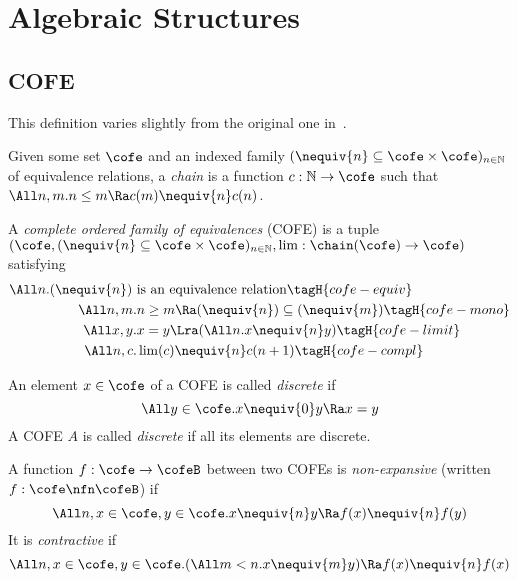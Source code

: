 \section{Algebraic Structures}

\subsection{COFE}

This definition varies slightly from the original one in~\cite{catlogic}.
\begin{defn}[Chain]
  Given some set $\cofe$ and an indexed family $({\nequiv{n}} \subseteq \cofe \times \cofe)_{n \in \mathbb{N}}$ of equivalence relations, a \emph{chain} is a function $c : \mathbb{N} \to \cofe$ such that $\All n, m. n \leq m \Ra c (m) \nequiv{n} c (n)$.
\end{defn}

\begin{defn}
  A \emph{complete ordered family of equivalences} (COFE) is a tuple $(\cofe, ({\nequiv{n}} \subseteq \cofe \times \cofe)_{n \in \mathbb{N}}, \lim : \chain(\cofe) \to \cofe)$ satisfying
  \begin{align*}
    \All n. (\nequiv{n}) ~& \text{is an equivalence relation} \tagH{cofe-equiv} \\
    \All n, m.& n \geq m \Ra (\nequiv{n}) \subseteq (\nequiv{m}) \tagH{cofe-mono} \\
    \All x, y.& x = y \Lra (\All n. x \nequiv{n} y) \tagH{cofe-limit} \\
    \All n, c.& \lim(c) \nequiv{n} c(n+1) \tagH{cofe-compl}
  \end{align*}
\end{defn}


\begin{defn}
  An element $x \in \cofe$ of a COFE is called \emph{discrete} if
  \[ \All y \in \cofe. x \nequiv{0} y \Ra x = y\]
  A COFE $A$ is called \emph{discrete} if all its elements are discrete.
\end{defn}

\begin{defn}
  A function $f : \cofe \to \cofeB$ between two COFEs is \emph{non-expansive} (written $f : \cofe \nfn \cofeB$) if
  \[\All n, x \in \cofe, y \in \cofe. x \nequiv{n} y \Ra f(x) \nequiv{n} f(y) \]
  It is \emph{contractive} if
  \[ \All n, x \in \cofe, y \in \cofe. (\All m < n. x \nequiv{m} y) \Ra f(x) \nequiv{n} f(x) \]
\end{defn}

